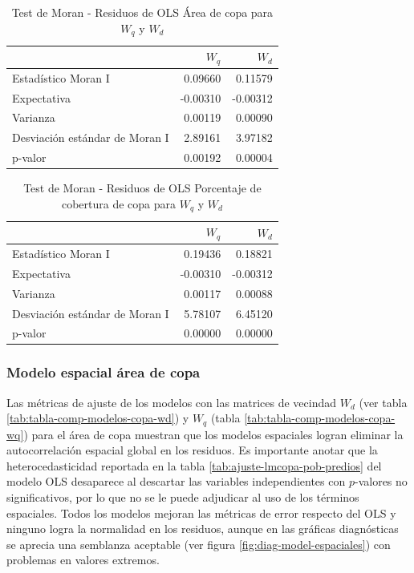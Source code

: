 \documentclass[12pt,a4paper,oneside, openany]{book}
\theoremstyle{definition}
\theoremstyle{definition}
\theoremstyle{definition}
\theoremstyle{remark}
\begin{document}
\begin{table}[H]

\caption{\label{tab:moran-rescopa-w}Test de Moran - Residuos de OLS Área de copa para $W_q$ y $W_d$}
\centering
\begin{tabular}{lrr}
\toprule
  & $W_q$ & $W_d$\\
\midrule
Estadístico Moran I & 0.09660 & 0.11579\\
Expectativa & -0.00310 & -0.00312\\
Varianza & 0.00119 & 0.00090\\
Desviación estándar de Moran I & 2.89161 & 3.97182\\
p-valor & 0.00192 & 0.00004\\
\bottomrule
\end{tabular}
\end{table}

\begin{table}[H]

\caption{\label{tab:moran-rescopaap-w}Test de Moran - Residuos de OLS Porcentaje de cobertura de copa para $W_q$ y $W_d$}
\centering
\begin{tabular}{lrr}
\toprule
  & $W_q$ & $W_d$\\
\midrule
Estadístico Moran I & 0.19436 & 0.18821\\
Expectativa & -0.00310 & -0.00312\\
Varianza & 0.00117 & 0.00088\\
Desviación estándar de Moran I & 5.78107 & 6.45120\\
p-valor & 0.00000 & 0.00000\\
\bottomrule
\end{tabular}
\end{table}

\subsubsection{Modelo espacial área de
copa}\label{modelo-espacial-uxe1rea-de-copa}

Las métricas de ajuste de los modelos con las matrices de vecindad
\(W_d\) (ver tabla \ref{tab:tabla-comp-modelos-copa-wd}) y \(W_q\)
(tabla \ref{tab:tabla-comp-modelos-copa-wq}) para el área de copa
muestran que los modelos espaciales logran eliminar la autocorrelación
espacial global en los residuos. Es importante anotar que la
heterocedasticidad reportada en la tabla
\ref{tab:ajuste-lmcopa-pob-predios} del modelo OLS desaparece al
descartar las variables independientes con \(p\)-valores no
significativos, por lo que no se le puede adjudicar al uso de los
términos espaciales. Todos los modelos mejoran las métricas de error
respecto del OLS y ninguno logra la normalidad en los residuos, aunque
en las gráficas diagnósticas se aprecia una semblanza aceptable (ver
figura \ref{fig:diag-model-espaciales}) con problemas en valores
extremos.
\end{document}
